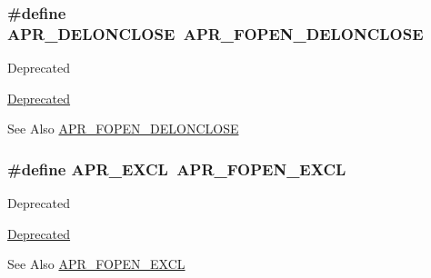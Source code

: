 \hypertarget{group__apr__file__open__flags_gaebc7f034a72dffe64858b1b9451994ff}{
\subsubsection[{A\-P\-R\-\_\-\-D\-E\-L\-O\-N\-C\-L\-O\-S\-E}]{\setlength{\rightskip}{0pt plus 5cm}\#define A\-P\-R\-\_\-\-D\-E\-L\-O\-N\-C\-L\-O\-S\-E~{\bf A\-P\-R\-\_\-\-F\-O\-P\-E\-N\-\_\-\-D\-E\-L\-O\-N\-C\-L\-O\-S\-E}}}\label{group__apr__file__open__flags_gaebc7f034a72dffe64858b1b9451994ff}
\begin{DoxyRefDesc}{Deprecated}
\item[\hyperlink{deprecated__deprecated000025}{Deprecated}]\end{DoxyRefDesc}
\begin{DoxySeeAlso}{See Also}
\hyperlink{group__apr__file__open__flags_ga5d3756f6d242c667ed1d3f54af4916eb}{A\-P\-R\-\_\-\-F\-O\-P\-E\-N\-\_\-\-D\-E\-L\-O\-N\-C\-L\-O\-S\-E} 
\end{DoxySeeAlso}
\hypertarget{group__apr__file__open__flags_ga209c26b2b903cc23417f6781d4edf891}{
\subsubsection[{A\-P\-R\-\_\-\-E\-X\-C\-L}]{\setlength{\rightskip}{0pt plus 5cm}\#define A\-P\-R\-\_\-\-E\-X\-C\-L~{\bf A\-P\-R\-\_\-\-F\-O\-P\-E\-N\-\_\-\-E\-X\-C\-L}}}\label{group__apr__file__open__flags_ga209c26b2b903cc23417f6781d4edf891}
\begin{DoxyRefDesc}{Deprecated}
\item[\hyperlink{deprecated__deprecated000023}{Deprecated}]\end{DoxyRefDesc}
\begin{DoxySeeAlso}{See Also}
\hyperlink{group__apr__file__open__flags_gabb7fb062cdf1d58faee8c7ea518496f1}{A\-P\-R\-\_\-\-F\-O\-P\-E\-N\-\_\-\-E\-X\-C\-L} 
\end{DoxySeeAlso}
